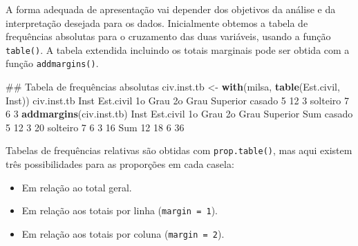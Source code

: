 \documentclass[10pt,a4paper]{book}
\newenvironment{Shaded}{\begin{snugshade}}{\end{snugshade}}
\newcommand{\KeywordTok}[1]{\textcolor[rgb]{0.13,0.29,0.53}{\textbf{#1}}}
\newcommand{\DecValTok}[1]{\textcolor[rgb]{0.00,0.00,0.81}{#1}}
\newcommand{\StringTok}[1]{\textcolor[rgb]{0.31,0.60,0.02}{#1}}
\newcommand{\NormalTok}[1]{#1}
\providecommand{\tightlist}{%
  \setlength{\itemsep}{0pt}\setlength{\parskip}{0pt}}
\begin{document}
A forma adequada de apresentação vai depender dos objetivos da análise e
da interpretação desejada para os dados. Inicialmente obtemos a tabela
de frequências absolutas para o cruzamento das duas variáveis, usando a
função \texttt{table()}. A tabela extendida incluindo os totais
marginais pode ser obtida com a função \texttt{addmargins()}.

\begin{Shaded}
\begin{Highlighting}[]
\NormalTok{## Tabela de frequências absolutas}
\NormalTok{civ.inst.tb <-}\StringTok{ }\KeywordTok{with}\NormalTok{(milsa, }\KeywordTok{table}\NormalTok{(Est.civil, Inst))}
\NormalTok{civ.inst.tb}
\NormalTok{          Inst}
\NormalTok{Est.civil  1o Grau 2o Grau Superior}
\NormalTok{  casado         }\DecValTok{5}      \DecValTok{12}        \DecValTok{3}
\NormalTok{  solteiro       }\DecValTok{7}       \DecValTok{6}        \DecValTok{3}
\KeywordTok{addmargins}\NormalTok{(civ.inst.tb)}
\NormalTok{          Inst}
\NormalTok{Est.civil  1o Grau 2o Grau Superior Sum}
\NormalTok{  casado         }\DecValTok{5}      \DecValTok{12}        \DecValTok{3}  \DecValTok{20}
\NormalTok{  solteiro       }\DecValTok{7}       \DecValTok{6}        \DecValTok{3}  \DecValTok{16}
\NormalTok{  Sum           }\DecValTok{12}      \DecValTok{18}        \DecValTok{6}  \DecValTok{36}
\end{Highlighting}
\end{Shaded}

Tabelas de frequências relativas são obtidas com \texttt{prop.table()},
mas aqui existem três possibilidades para as proporções em cada casela:

\begin{itemize}
\tightlist
\item
  Em relação ao total geral.
\item
  Em relação aos totais por linha (\texttt{margin\ =\ 1}).
\item
  Em relação aos totais por coluna (\texttt{margin\ =\ 2}).
\end{itemize}
\end{document}
